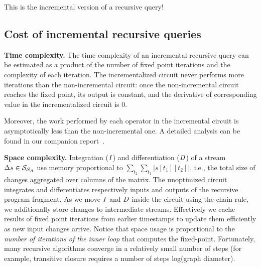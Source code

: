 \noindent This is the incremental version of a recursive query!



\subsection{Cost of incremental recursive queries}

\textbf{Time complexity.}
The time complexity of an incremental recursive query can be estimated
as a product of the number of fixed point iterations and the
complexity of each iteration. The incrementalized circuit never
performs more iterations than the non-incremental circuit: once the
non-incremental circuit reaches the fixed point, its output is
constant, and the derivative of corresponding value in the
incrementalized circuit is 0.

Moreover, the work performed by each operator in the incremental
circuit is asymptotically less than the non-incremental one.  A
detailed analysis can be found in our companion report~\cite{tr}.


\textbf{Space complexity.} Integration ($\mathit{I}$) and differentiation ($\mathit{D}$) of a
stream $\Delta s \in \mathcal{S}_{\mathcal{S}_{A}}$ use memory proportional to
$\sum_{t_2}\sum_{t_1}|s[t_1][t_2]|$, i.e., the total size of changes
aggregated over columns of the matrix.  The unoptimized circuit integrates
and differentiates respectively inputs and outputs of the recursive program
fragment.  As we move $\mathit{I}$ and $\mathit{D}$ inside the circuit using the chain rule, we
additionally store changes to intermediate streams.  Effectively we cache results of
fixed point iterations from earlier timestamps to update them efficiently as new input changes arrive.
Notice that space usage is proportional to the \emph{number of iterations of the inner loop}
that computes the fixed-point.
Fortunately, many recursive algorithms converge in a relatively small number of steps
(for example, transitive closure requires a number of steps  log(graph diameter).
